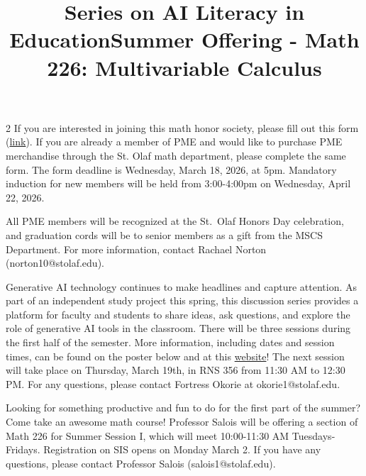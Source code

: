 \documentclass[12pt]{article}
\newcommand{\bolder}{\textbf}
\begin{document}
\begin{multicols}{2}
If you are interested in joining this math honor society, please fill out this form (\href{https://docs.google.com/forms/d/e/1FAIpQLSfXZQxdboX2mFuk5T39eG9ELSichO3ZOU6O35mqC4eaRahDWw/viewform}{link}). If you are already a member of PME and would like to purchase PME merchandise through the St. Olaf math department, please complete the same form. The form deadline is Wednesday, March 18, 2026, at 5pm. Mandatory induction for new members will be held from 3:00-4:00pm on Wednesday, April 22, 2026.

All PME members will be recognized at the St.~Olaf Honors Day celebration, and graduation cords will be to senior members as a gift from the MSCS Department. For more information, contact Rachael Norton (norton10@stolaf.edu).


 \begin{tcolorbox}[colback=white, colframe=black]
    \begin{center}
    \title{{\large \bolder{Series on AI Literacy in Education}}}
    \end{center}
\end{tcolorbox}
Generative AI technology continues to make headlines and capture attention. As part of an independent study project this spring, this discussion series provides a platform for faculty and students to share ideas, ask questions, and explore the role of generative AI tools in the classroom. There will be three sessions during the first half of the semester. More information, including dates and session times, can be found on the poster below and at this \href{https://fortressokorie.github.io/ai_literacy/} {website}! The next session will take place on Thursday, March 19th, in RNS 356 from 11:30 AM to 12:30 PM. For any questions, please contact Fortress Okorie at okorie1@stolaf.edu.

\begin{tcolorbox}[colback=white, colframe=black]
    \begin{center}
    \title{{\large \bolder{Summer Offering - Math 226: Multivariable Calculus}}}
    \end{center}
\end{tcolorbox}
Looking for something productive and fun to do for the first part of the summer?  Come take an awesome math course!  Professor Salois will be offering a section of Math 226 for Summer Session I, which will meet 10:00-11:30 AM Tuesdays-Fridays.  Registration on SIS opens on Monday March 2.  If you have any questions, please contact Professor Salois (salois1@stolaf.edu).  


\end{multicols}
\end{document}
